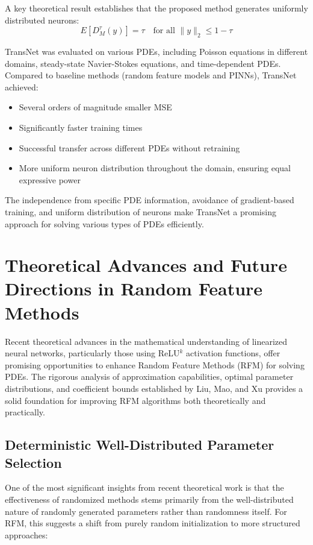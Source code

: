 \documentclass[11pt]{article}
\begin{document}
A key theoretical result establishes that the proposed method generates uniformly distributed neurons:
\begin{equation}
    E[D_M^\tau(y)] = \tau \quad \text{for all } \|y\|_2 \leq 1-\tau
\end{equation}

TransNet was evaluated on various PDEs, including Poisson equations in different domains, steady-state Navier-Stokes equations, and time-dependent PDEs. Compared to baseline methods (random feature models and PINNs), TransNet achieved:
\begin{itemize}
    \item Several orders of magnitude smaller MSE
    \item Significantly faster training times
    \item Successful transfer across different PDEs without retraining
    \item More uniform neuron distribution throughout the domain, ensuring equal expressive power
\end{itemize}

The independence from specific PDE information, avoidance of gradient-based training, and uniform distribution of neurons make TransNet a promising approach for solving various types of PDEs efficiently.

\section{Theoretical Advances and Future Directions in Random Feature Methods}

Recent theoretical advances in the mathematical understanding of linearized neural networks, particularly those using ReLU$^k$ activation functions, offer promising opportunities to enhance Random Feature Methods (RFM) for solving PDEs. The rigorous analysis of approximation capabilities, optimal parameter distributions, and coefficient bounds established by Liu, Mao, and Xu \citep{LiuMaoXu2025} provides a solid foundation for improving RFM algorithms both theoretically and practically.

\subsection{Deterministic Well-Distributed Parameter Selection}

One of the most significant insights from recent theoretical work is that the effectiveness of randomized methods stems primarily from the well-distributed nature of randomly generated parameters rather than randomness itself. For RFM, this suggests a shift from purely random initialization to more structured approaches:
\end{document}
